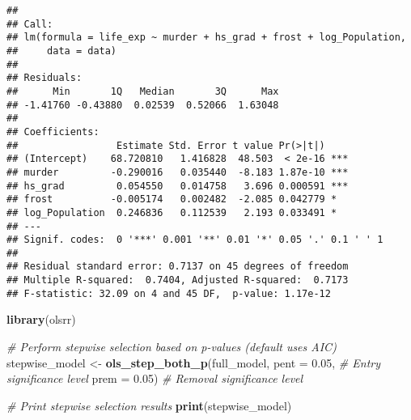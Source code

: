 \documentclass[
]{article}
\newenvironment{Shaded}{\begin{snugshade}}{\end{snugshade}}
\newcommand{\AttributeTok}[1]{\textcolor[rgb]{0.13,0.29,0.53}{#1}}
\newcommand{\CommentTok}[1]{\textcolor[rgb]{0.56,0.35,0.01}{\textit{#1}}}
\newcommand{\FloatTok}[1]{\textcolor[rgb]{0.00,0.00,0.81}{#1}}
\newcommand{\FunctionTok}[1]{\textcolor[rgb]{0.13,0.29,0.53}{\textbf{#1}}}
\newcommand{\NormalTok}[1]{#1}
\newcommand{\OtherTok}[1]{\textcolor[rgb]{0.56,0.35,0.01}{#1}}
\begin{document}
\begin{verbatim}
## 
## Call:
## lm(formula = life_exp ~ murder + hs_grad + frost + log_Population, 
##     data = data)
## 
## Residuals:
##      Min       1Q   Median       3Q      Max 
## -1.41760 -0.43880  0.02539  0.52066  1.63048 
## 
## Coefficients:
##                 Estimate Std. Error t value Pr(>|t|)    
## (Intercept)    68.720810   1.416828  48.503  < 2e-16 ***
## murder         -0.290016   0.035440  -8.183 1.87e-10 ***
## hs_grad         0.054550   0.014758   3.696 0.000591 ***
## frost          -0.005174   0.002482  -2.085 0.042779 *  
## log_Population  0.246836   0.112539   2.193 0.033491 *  
## ---
## Signif. codes:  0 '***' 0.001 '**' 0.01 '*' 0.05 '.' 0.1 ' ' 1
## 
## Residual standard error: 0.7137 on 45 degrees of freedom
## Multiple R-squared:  0.7404, Adjusted R-squared:  0.7173 
## F-statistic: 32.09 on 4 and 45 DF,  p-value: 1.17e-12
\end{verbatim}

\begin{Shaded}
\begin{Highlighting}[]
\FunctionTok{library}\NormalTok{(olsrr)}

\CommentTok{\# Perform stepwise selection based on p{-}values (default uses AIC)}
\NormalTok{stepwise\_model }\OtherTok{\textless{}{-}} \FunctionTok{ols\_step\_both\_p}\NormalTok{(full\_model, }
                                  \AttributeTok{pent =} \FloatTok{0.05}\NormalTok{,  }\CommentTok{\# Entry significance level}
                                  \AttributeTok{prem =} \FloatTok{0.05}\NormalTok{) }\CommentTok{\# Removal significance level}

\CommentTok{\# Print stepwise selection results}
\FunctionTok{print}\NormalTok{(stepwise\_model)}
\end{Highlighting}
\end{Shaded}
\end{document}
